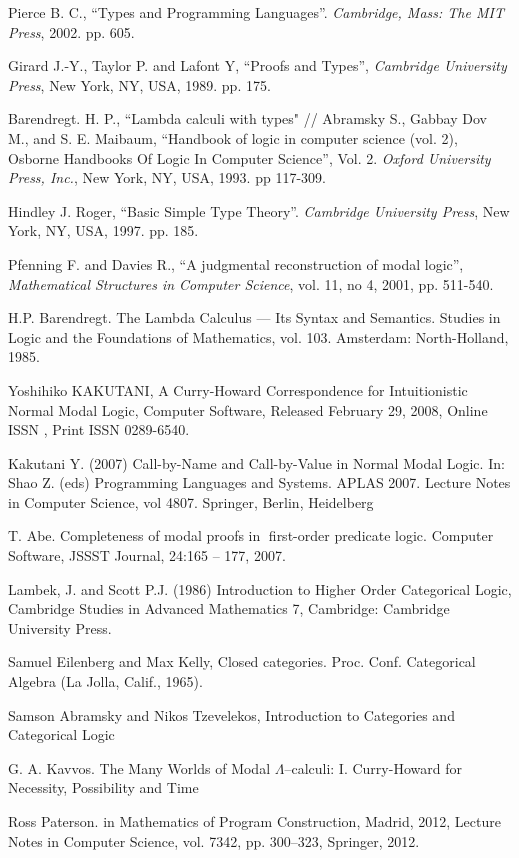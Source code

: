 \begin{thebibliography}{}
 Pierce B. C., ``Types and Programming Languages''. \textit{Cambridge, Mass: The MIT
Press}, 2002. pp. 605. \parskip=1mm

 Girard J.-Y., Taylor P. and  Lafont Y, ``Proofs and Types'', \textit{Cambridge University
Press}, New York, NY, USA, 1989. pp. 175. \parskip=1mm

 Barendregt. H. P., ``Lambda calculi with types" // Abramsky S., Gabbay Dov M., and S. E.
Maibaum, ``Handbook of logic in computer science (vol. 2), Osborne Handbooks Of Logic In Computer
Science'', Vol. 2. \textit{Oxford University Press, Inc.}, New York, NY, USA, 1993. pp 117-309.
\parskip=1mm

 Hindley J. Roger, ``Basic Simple Type Theory''. \textit{Cambridge University Press}, New
York, NY, USA, 1997. pp. 185. \parskip=1mm

 Pfenning F. and Davies R., ``A judgmental reconstruction of modal logic'',
\textit{Mathematical Structures in Computer Science}, vol. 11, no 4, 2001, pp. 511-540. \parskip=1mm

 H.P. Barendregt. The Lambda Calculus --- Its Syntax and Semantics. Studies in Logic and
the Foundations of Mathematics, vol. 103. Amsterdam: North-Holland, 1985.

 Yoshihiko KAKUTANI, A Curry-Howard Correspondence for Intuitionistic Normal Modal Logic, Computer Software, Released February 29, 2008, Online ISSN , Print ISSN 0289-6540.

 Kakutani Y. (2007) Call-by-Name and Call-by-Value in Normal Modal Logic. In: Shao Z. (eds) Programming Languages and Systems. APLAS 2007. Lecture Notes in Computer Science, vol 4807. Springer, Berlin, Heidelberg

 T. Abe. Completeness of modal proofs in first-order predicate logic. Computer Software, JSSST Journal, 24:165 -- 177, 2007.

 Lambek, J. and Scott P.J. (1986) Introduction to Higher Order Categorical Logic, Cambridge Studies in Advanced Mathematics 7, Cambridge: Cambridge University Press.

 Samuel Eilenberg and Max Kelly, Closed categories. Proc. Conf. Categorical Algebra (La Jolla, Calif., 1965).

 Samson Abramsky and Nikos Tzevelekos, Introduction to Categories and Categorical Logic

 G. A. Kavvos. The Many Worlds of Modal $\Lambda$--calculi: I. Curry-Howard for Necessity, Possibility and Time

 Ross Paterson. in Mathematics of Program Construction, Madrid, 2012, Lecture Notes in Computer Science, vol. 7342, pp. 300--323, Springer, 2012.
\end{thebibliography}
